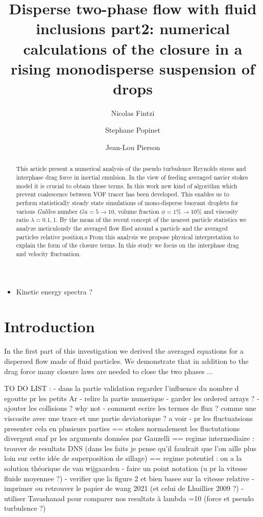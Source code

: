 \documentclass[12pt]{My_preprint}
\title{Disperse two-phase flow with fluid inclusions part2: numerical calculations of the closure in a rising monodisperse suspension of drops}
\author[1,2]{Nicolas Fintzi}
\author[2]{Stephane Popinet}
\author[1]{Jean-Lou Pierson}
\affil[1]{IFP Energies Nouvelles, Rond-point de l’changeur de Solaize, 69360 Solaize}
\affil[2]{Sorbonne Université, Institut Jean le Rond d’Alembert, 4 place Jussieu, 75252 PARIS CEDEX 05, France}
\newcommand{\JL}[1]{\color{red}#1\color{black}}
\newcommand{\tb}[1]{\color{blue}#1\color{black}}
\begin{document}
\maketitle

\begin{abstract}
    This article present a numerical analysis of the pseudo turbulence Reynolds stress and interphase drag force in inertial emulsion. 
    In the view of feeding averaged navier stokes model it is crucial to obtain those terms. 
    In this work new kind of algorithm which prevent coalescence between VOF tracer has been developed.
    This enables us to perform statistically steady state simulations of mono-disperse buoyant droplets for various \textit{Galileo} number $Ga = 5 \rightarrow 10$, volume fraction $\phi =1\% \rightarrow 10\%$ and viscosity ratio $\lambda = 0.1,1$. 
    By the mean of the recent concept of the nearest particle statistics \citep{zhang2021stress} we analyze meticulously the averaged flow flied around a particle and the averaged particles relative position.s 
    From this analysis we propose physical interpretation to explain the form of the closure terms.
    In this study we focus on the interphase drag and velocity fluctuation. 
\end{abstract}
\tableofcontents
\listoftodos
\begin{itemize}
    \item \tb{Kinetic energy spectra ?}{NO}
\end{itemize}



\section{Introduction}
In the first part of this investigation we derived the averaged equations for a dispersed flow made of fluid particles. We demonstrate that in addition to the drag force many closure laws are needed to close the two phases ...

\JL{TO DO LIST :
- dans la partie validation regarder l'influence du nombre d egoutte pr les petits Ar
- relire la partie numerique
- garder les ordered arrays ?
- ajouter les collisions ? why not
- comment ecrire les termes de flux ? comme une viscosite avec une trace et une partie deviatorique ? a voir
- pr les fluctuatsions presenter cela en plusieurs parties
== stokes normalement les fluctutations divergent suaf pr les arguments données par Gauzelli
== regime intermediaire : trouver de resultats DNS (dans les faits je pense qu'il faudrait que l'on aille plus loin sur cette idée de superposition de sillage)
== regime potentiel : on a la solution théorique de van wijgaarden
- faire un point notation (u pr la vitesse fluide moyennee ?)
- verifier que la figure 2 et bien basee sur la vitesse relative}
- imprimer ou retrouver le papier de wang 2021 (et celui de Lhuillier 2009 ?)
- utiliser Tavashanad pour comparer nos resultats à lambda =10 (force et pseudo turbulence ?)


\end{document}
